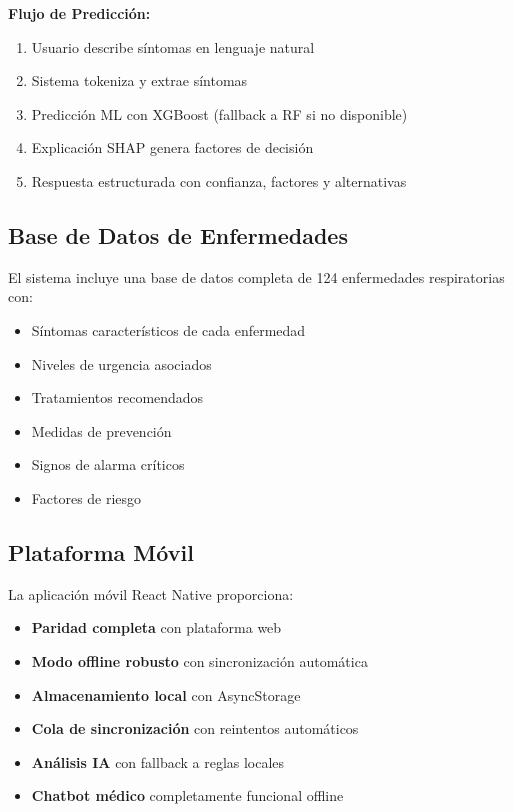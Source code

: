 \documentclass[12pt,a4paper]{article}
\begin{document}
\textbf{Flujo de Predicción:}
\begin{enumerate}
    \item Usuario describe síntomas en lenguaje natural
    \item Sistema tokeniza y extrae síntomas
    \item Predicción ML con XGBoost (fallback a RF si no disponible)
    \item Explicación SHAP genera factores de decisión
    \item Respuesta estructurada con confianza, factores y alternativas
\end{enumerate}

\subsection{Base de Datos de Enfermedades}

El sistema incluye una base de datos completa de 124 enfermedades respiratorias con:

\begin{itemize}
    \item Síntomas característicos de cada enfermedad
    \item Niveles de urgencia asociados
    \item Tratamientos recomendados
    \item Medidas de prevención
    \item Signos de alarma críticos
    \item Factores de riesgo
\end{itemize}

\subsection{Plataforma Móvil}

La aplicación móvil React Native proporciona:

\begin{itemize}
    \item \textbf{Paridad completa} con plataforma web
    \item \textbf{Modo offline robusto} con sincronización automática
    \item \textbf{Almacenamiento local} con AsyncStorage
    \item \textbf{Cola de sincronización} con reintentos automáticos
    \item \textbf{Análisis IA} con fallback a reglas locales
    \item \textbf{Chatbot médico} completamente funcional offline
\end{itemize}
\end{document}
